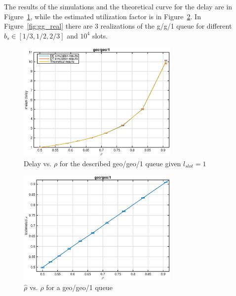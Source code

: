 \documentclass[10pt]{article}
\begin{document}
The results of the simulations and the theoretical curve for the delay are in Figure~\ref{fig:gg1_dl}, while the estimated utilization factor is in Figure~\ref{fig:gg1_rho}. In Figure~\ref{fig:gg_real} there are 3 realizations of the g/g/1 queue for different $b_s \in [1/3, 1/2, 2/3]$ and $10^4$ slots.

\begin{figure}[h!]
	\centering
	\includegraphics[width = 0.7\textwidth]{gg1_dl}
	\caption{Delay vs. $\rho$ for the described geo/geo/1 queue given $l_{slot} = 1$}
	\label{fig:gg1_dl}
\end{figure}

\begin{figure}[h!]
	\centering
	\includegraphics[width = 0.7\textwidth]{gg1_rho}
	\caption{$\hat{\rho}$ vs. $\rho$ for a geo/geo/1 queue}
	\label{fig:gg1_rho}
\end{figure}

\clearpage
\end{document}
